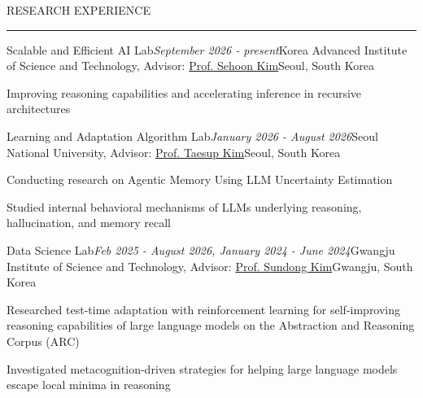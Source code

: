 \documentclass{resume} %
\renewenvironment{rSection}[2][]{
\vspace{-0.5 em} %
\sectionskip
\noindent\textcolor{RoyalPurple}{\MakeUppercase{#2}}\hfill{\footnotesize #1}\par
\sectionlineskip
\hrule
\begin{list}{}{
\setlength{\leftmargin}{1.5em}
}
\item[]
}{
\end{list}
}
\begin{document}
\vspace{+0.5 em} %
\begin{rSection}{Research Experience}


\begin{rSubsection}{Scalable and Efficient AI Lab}{\em September 2026 - present}{Korea Advanced Institute of Science and Technology, Advisor: \href{https://sehoonkim.org/}{Prof. Sehoon Kim}}{Seoul, South Korea}
\vspace{-0.3 em}
\item Improving reasoning capabilities and accelerating inference in recursive architectures

\end{rSubsection}

\vspace{-0.75 em}

\begin{rSubsection}{Learning and Adaptation Algorithm Lab}{\em January 2026 - August 2026}{Seoul National University, Advisor: \href{https://www.snu-laal.com/}{Prof. Taesup Kim}}{Seoul, South Korea}
\vspace{-0.3 em}
\item Conducting research on Agentic Memory Using LLM Uncertainty Estimation
\item Studied internal behavioral mechanisms of LLMs underlying reasoning, hallucination, and memory recall

\end{rSubsection}

\vspace{-0.75 em}

\begin{rSubsection}{Data Science Lab}{\em Feb 2025 - August 2026, January 2024 - June 2024}{Gwangju Institute of Science and Technology, Advisor: \href{https://sundong.kim/}{Prof. Sundong Kim}}{Gwangju, South Korea}
\vspace{-0.3 em}
\item Researched test-time adaptation with reinforcement learning for self-improving reasoning capabilities of large language models on the Abstraction and Reasoning Corpus (ARC)
\item Investigated metacognition-driven strategies for helping large language models escape local minima in reasoning


\end{rSubsection}
\end{rSection}
\end{document}
